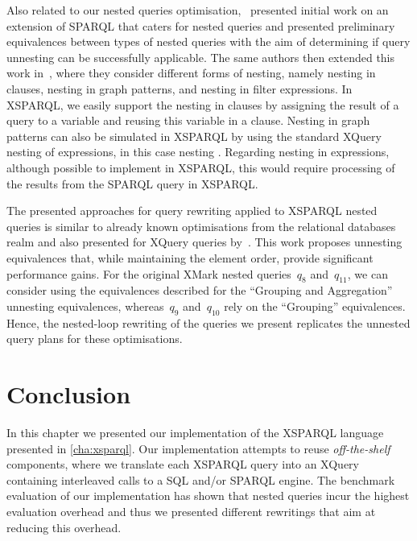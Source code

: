 Also related to our nested queries optimisation,~\citet{AnglesGutierrez:2010aa} presented initial work on an extension
of SPARQL that caters for nested queries and presented preliminary equivalences between types of nested queries with the
aim of determining if query unnesting can be successfully applicable.
%
The same authors then extended this work in~\citet{AnglesGutierrez:2011aa}, where they consider different forms of
nesting, namely nesting in \FROM clauses, nesting in graph patterns, and nesting in filter expressions.
%
In XSPARQL, we easily support the nesting in \FROM clauses by assigning the result of a \CONSTRUCT query to a variable
and reusing this variable in a \FROM clause.  Nesting in graph patterns can also be simulated in XSPARQL by using the
standard XQuery nesting of expressions, in this case nesting .  
%
Regarding nesting in \FILTER expressions, although possible to implement in XSPARQL, this would require processing of
the results from the SPARQL query in XSPARQL.




The presented approaches for query rewriting applied to XSPARQL nested queries is similar to already known optimisations
from the relational databases realm and also presented for XQuery queries by~\citet{MayHelmerMoerkotte:2003aa}.  
%
This work proposes unnesting equivalences that, while maintaining the element order, provide significant performance
gains.  For the original XMark nested queries~$q_{8}$ and~$q_{11}$, we can consider using the equivalences described for
the ``Grouping and Aggregation'' unnesting equivalences, whereas~$q_{9}$ and~$q_{10}$ rely on the ``Grouping''
equivalences.  Hence, the nested-loop rewriting of the queries we present replicates the unnested query plans for these
optimisations.




\section{Conclusion}
\label{sec:conclusions-optimisations}

In this chapter we presented our implementation of the XSPARQL language presented in \cref{cha:xsparql}.  Our
implementation attempts to reuse \emph{off-the-shelf} components, where we translate each XSPARQL query into an XQuery
containing interleaved calls to a \ac{SQL} and/or SPARQL engine.
%
The benchmark evaluation of our implementation has shown that nested queries incur the highest evaluation overhead and
thus we presented different rewritings that aim at reducing this overhead.

